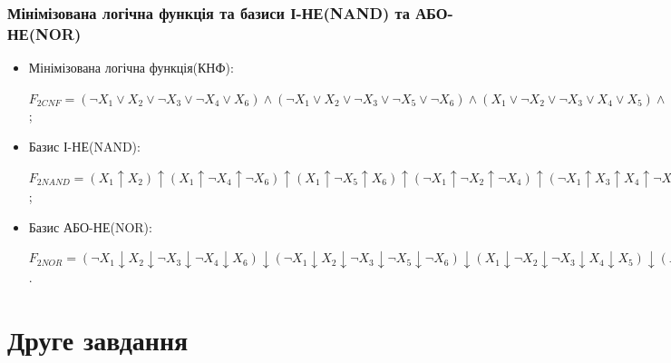 \subsection{Мінімізована логічна функція та базиси І-НЕ(NAND) та АБО-НЕ(NOR)}
\begin{itemize}
\item Мінімізована логічна функція(КНФ):

$F_{2 CNF}=(\neg X_{1}\lor X_{2}\lor \neg X_{3}\lor \neg X_{4}\lor X_{6})\land (\neg X_{1}\lor X_{2}\lor \neg X_{3}\lor \neg X_{5}\lor \neg X_{6})\land (X_{1}\lor \neg X_{2}\lor \neg X_{3}\lor X_{4}\lor X_{5})\land (X_{1}\lor \neg X_{2}\lor X_{3}\lor \neg X_{4}\lor \neg X_{5})\land (X_{1}\lor \neg X_{2}\lor X_{3}\lor \neg X_{4}\lor X_{6})\land (X_{1}\lor \neg X_{2}\lor X_{4}\lor X_{5}\lor \neg X_{6})\land (X_{1}\lor X_{2}\lor \neg X_{3}\lor \neg X_{4}\lor \neg X_{6})$;
\item Базис І-НЕ(NAND):

$F_{2 NAND}=(X_{1}\uparrow X_{2})\uparrow (X_{1}\uparrow \neg X_{4}\uparrow \neg X_{6})\uparrow (X_{1}\uparrow \neg X_{5}\uparrow X_{6})\uparrow (\neg X_{1}\uparrow \neg X_{2}\uparrow \neg X_{4})\uparrow (\neg X_{1}\uparrow X_{3}\uparrow X_{4}\uparrow \neg X_{6})\uparrow (\neg X_{1}\uparrow \neg X_{4}\uparrow X_{5})\uparrow (X_{2}\uparrow X_{3}\uparrow X_{4})\uparrow (X_{2}\uparrow X_{4}\uparrow \neg X_{5}\uparrow X_{6})\uparrow (\neg X_{2}\uparrow \neg X_{3})\uparrow (\neg X_{3}\uparrow \neg X_{4}\uparrow \neg X_{6})$;
\item Базис АБО-НЕ(NOR):

$F_{2 NOR}=(\neg X_{1}\downarrow X_{2}\downarrow\neg X_{3}\downarrow\neg X_{4}\downarrow X_{6})\downarrow(\neg X_{1}\downarrow X_{2}\downarrow\neg X_{3}\downarrow\neg X_{5}\downarrow\neg X_{6})\downarrow(X_{1}\downarrow\neg X_{2}\downarrow\neg X_{3}\downarrow X_{4}\downarrow X_{5})\downarrow(X_{1}\downarrow\neg X_{2}\downarrow X_{3}\downarrow\neg X_{4}\downarrow\neg X_{5})\downarrow(X_{1}\downarrow\neg X_{2}\downarrow X_{3}\downarrow\neg X_{4}\downarrow X_{6})\downarrow(X_{1}\downarrow\neg X_{2}\downarrow X_{4}\downarrow X_{5}\downarrow\neg X_{6})\downarrow(X_{1}\downarrow X_{2}\downarrow\neg X_{3}\downarrow\neg X_{4}\downarrow\neg X_{6})$.
\end{itemize}

\newpage
\chapter{Друге завдання}
